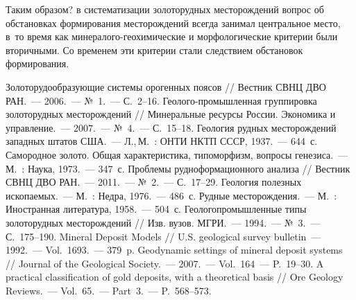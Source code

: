 Таким образом? в систематизации золоторудных месторождений вопрос об обстановках формирования месторождений всегда занимал центральное место, в~то время как минералого-геохимические и морфологические критерии были вторичными. Со временем эти критерии стали следствием обстановок формирования.

\begin{thebibliography}{99}
\bibitem{} Золоторудообразующие системы орогенных поясов // Вестник СВНЦ ДВО РАН.~--- 2006.~--- №~1.~--- С.~2--16.
\bibitem{} Геолого-промышленная группировка золоторудных месторождений // Минеральные ресурсы России. Экономика и управление.~--- 2007.~--- №~4.~--- С.~15--18.
\bibitem{} Геология рудных месторождений западных штатов США.~--- Л.,\,М.~: ОНТИ НКТП СССР, 1937.~--- 644~с.
\bibitem{} Самородное золото. Общая характеристика, типоморфизм, вопросы генезиса.~--- М.~: Наука, 1973.~--- 347~с.
\bibitem{} Проблемы рудноформационного анализа // Вестник СВНЦ ДВО РАН.~--- 2011.~--- №~2.~--- С.~17--29.
\bibitem{} Геология полезных ископаемых.~--- М.~: Недра, 1976.~--- 486~с.
\bibitem{} Рудные месторождения.~--- М.~: Иностранная литература, 1958.~--- 504~с.
\bibitem{} Геологопромышленные типы золоторудных месторождений // Изв. вузов. МГРИ.~--- 1994.~--- №~3.~--- С.~175--190.
\bibitem{} Mineral Deposit Models // U.S. geological survey bulletin~--- 1992.~--- Vol.~1693.~--- 379~p.
\bibitem{} Geodynamic settings of mineral deposit systems // Journal of the Geological Society.~--- 2007.~--- Vol.~164~--- P.~19--30.
\bibitem{} A practical classification of gold deposits, with a theoretical basis // Ore Geology Reviews.~--- Vol.~65.~--- Part~3.~--- P.~568--573.
\end{thebibliography}
\thispagestyle{empty}
